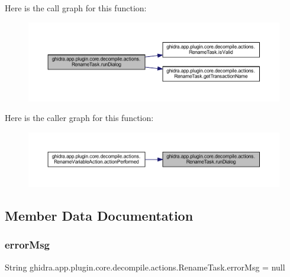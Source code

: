 Here is the call graph for this function\+:
\nopagebreak
\begin{figure}[H]
\begin{center}
\leavevmode
\includegraphics[width=350pt]{classghidra_1_1app_1_1plugin_1_1core_1_1decompile_1_1actions_1_1_rename_task_a871de7fef6150006478b2b3a8f56ec15_cgraph}
\end{center}
\end{figure}
Here is the caller graph for this function\+:
\nopagebreak
\begin{figure}[H]
\begin{center}
\leavevmode
\includegraphics[width=350pt]{classghidra_1_1app_1_1plugin_1_1core_1_1decompile_1_1actions_1_1_rename_task_a871de7fef6150006478b2b3a8f56ec15_icgraph}
\end{center}
\end{figure}


\subsection{Member Data Documentation}
\mbox{\label{classghidra_1_1app_1_1plugin_1_1core_1_1decompile_1_1actions_1_1_rename_task_a710874a0fe2e4c9c1a218ea20af426aa}} 
\subsubsection{\texorpdfstring{errorMsg}{errorMsg}}
{\footnotesize\ttfamily String ghidra.\+app.\+plugin.\+core.\+decompile.\+actions.\+Rename\+Task.\+error\+Msg = null\hspace{0.3cm}{\ttfamily [protected]}}



